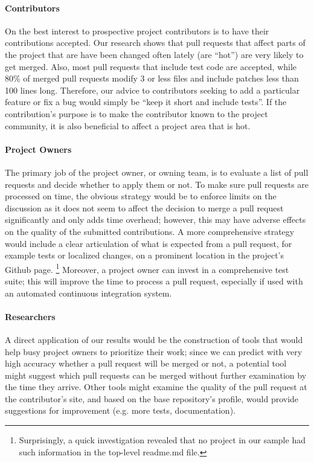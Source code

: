 \documentclass{sig-alternate}
\begin{document}
\paragraph{Contributors} 

On the best interest to prospective project contributors is to have their
contributions accepted.  Our research shows that pull requests that affect parts
of the project that are have been changed often lately (are ``hot'') are very
likely to get merged. Also, most pull requests that include test code are
accepted, while 80\% of merged pull requests modify 3 or less files and include
patches less than 100 lines long. Therefore, our advice to contributors seeking
to add a particular feature or fix a bug would simply be ``keep it short and
include tests''. If the contribution's purpose is to make the contributor known
to the project community, it is also beneficial to affect a project area that is
hot. 

\paragraph{Project Owners} The primary job of the project owner, or owning team,
is to evaluate a list of pull requests and decide whether to apply them or not.
To make sure pull requests are processed on time, the obvious strategy would be
to enforce limits on the discussion as it does not seem to affect the decision
to merge a pull request significantly and only adds time overhead; however, this
may have adverse effects on the quality of the submitted contributions. A more
comprehensive strategy would include a clear articulation of what is expected
from a pull request, for example tests or localized changes, on a prominent
location in the project's Github page. \footnote{Surprisingly, a quick
investigation revealed that no project in our sample had such information in
the top-level {\sc readme}.md file.} Moreover, a project owner can invest in a
comprehensive test suite; this will improve the time to process a pull request,
especially if used with an automated continuous integration system.


\paragraph{Researchers}

A direct application of our results would be the construction of tools that
would help busy project owners to prioritize their work; since we can predict
with very high accuracy whether a pull request will be merged or not, a
potential tool might suggest which pull requests can be merged without further
examination by the time they arrive. Other tools might examine the quality of
the pull request at the contributor's site, and based on the base repository's
profile, would provide suggestions for improvement (e.g. more tests,
documentation). 
\end{document}
